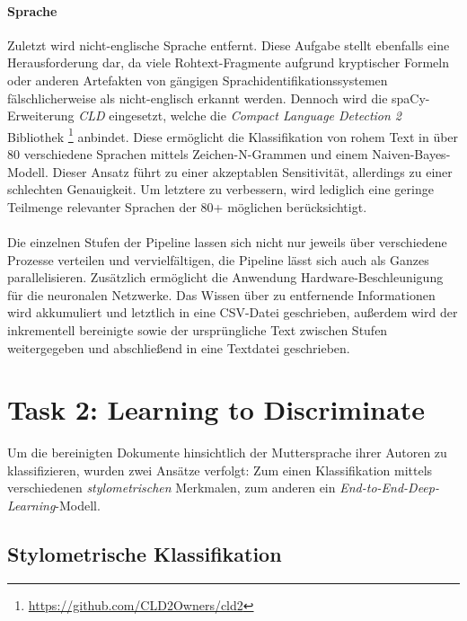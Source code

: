 \documentclass[bachelor,german]{info1thesis}
\begin{document}
\paragraph{Sprache} Zuletzt wird nicht-englische Sprache entfernt. Diese Aufgabe stellt ebenfalls eine Herausforderung dar, da viele Rohtext-Fragmente aufgrund kryptischer Formeln oder anderen Artefakten von gängigen Sprachidentifikationssystemen fälschlicherweise als nicht-englisch erkannt werden. Dennoch wird die spaCy-Erweiterung \textit{CLD} eingesetzt, welche die \textit{Compact Language Detection 2} Bibliothek \footnote{\url{https://github.com/CLD2Owners/cld2}} anbindet. Diese ermöglicht die Klassifikation von rohem  Text in über 80 verschiedene Sprachen mittels Zeichen-N-Grammen und einem Naiven-Bayes-Modell. Dieser Ansatz führt zu einer akzeptablen Sensitivität, allerdings zu einer schlechten Genauigkeit. Um letztere zu verbessern, wird lediglich eine geringe Teilmenge relevanter Sprachen der 80+ möglichen berücksichtigt.
\\
\\
Die einzelnen Stufen der Pipeline lassen sich nicht nur jeweils über verschiedene Prozesse verteilen und vervielfältigen, die Pipeline lässt sich auch als Ganzes parallelisieren. Zusätzlich ermöglicht die Anwendung Hardware-Beschleunigung für die neuronalen Netzwerke. Das Wissen über zu entfernende Informationen wird akkumuliert und letztlich in eine CSV-Datei geschrieben, außerdem wird der inkrementell bereinigte sowie der ursprüngliche Text zwischen Stufen weitergegeben und abschließend in eine Textdatei geschrieben.

\section{Task 2: Learning to Discriminate}

Um die bereinigten Dokumente hinsichtlich der Muttersprache ihrer Autoren zu klassifizieren, wurden zwei Ansätze verfolgt: Zum einen Klassifikation mittels verschiedenen \textit{stylometrischen} Merkmalen, zum anderen ein \textit{End-to-End-Deep-Learning}-Modell.

\subsection{Stylometrische Klassifikation}
\end{document}
